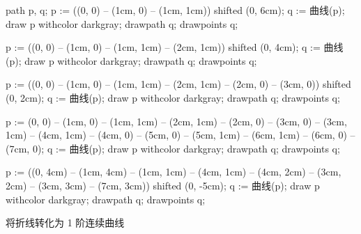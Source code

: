 \usemodule[zhfonts]

path p, q;
p := ((0, 0) -- (1cm, 0) -- (1cm, 1cm)) shifted (0, 6cm);
q := 曲线(p); draw p withcolor darkgray; drawpath q; drawpoints q;

p := ((0, 0) -- (1cm, 0) -- (1cm, 1cm) -- (2cm, 1cm)) shifted (0, 4cm);
q := 曲线(p); draw p withcolor darkgray; drawpath q; drawpoints q;

p := ((0, 0) -- (1cm, 0) -- (1cm, 1cm) -- (2cm, 1cm) -- (2cm, 0) -- (3cm, 0)) shifted (0, 2cm);
q := 曲线(p); draw p withcolor darkgray; drawpath q; drawpoints q;

p := (0, 0) -- (1cm, 0) -- (1cm, 1cm) -- (2cm, 1cm) -- (2cm, 0) -- (3cm, 0) -- (3cm, 1cm) -- (4cm, 1cm) -- (4cm, 0) -- (5cm, 0) -- (5cm, 1cm) -- (6cm, 1cm) -- (6cm, 0) -- (7cm, 0);
q := 曲线(p); draw p withcolor darkgray; drawpath q; drawpoints q;

p := ((0, 4cm) -- (1cm, 4cm) -- (1cm, 1cm) -- (4cm, 1cm) 
  -- (4cm, 2cm) -- (3cm, 2cm) -- (3cm, 3cm) -- (7cm, 3cm)) shifted (0, -5cm);
q := 曲线(p); draw p withcolor darkgray; drawpath q; drawpoints q;
\stopuseMPgraphic

\startTEXpage[offset=4pt]
将折线转化为 1 阶连续曲线
\blank
{}
\stopTEXpage
